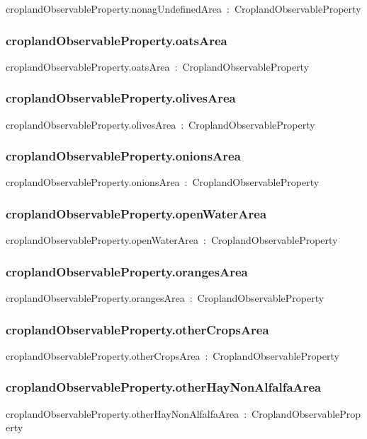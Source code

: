 \documentclass{article}
\begin{document}
croplandObservableProperty.nonagUndefinedArea~:~CroplandObservableProperty

\subsubsection*{croplandObservableProperty.oatsArea}

croplandObservableProperty.oatsArea~:~CroplandObservableProperty

\subsubsection*{croplandObservableProperty.olivesArea}

croplandObservableProperty.olivesArea~:~CroplandObservableProperty

\subsubsection*{croplandObservableProperty.onionsArea}

croplandObservableProperty.onionsArea~:~CroplandObservableProperty

\subsubsection*{croplandObservableProperty.openWaterArea}

croplandObservableProperty.openWaterArea~:~CroplandObservableProperty

\subsubsection*{croplandObservableProperty.orangesArea}

croplandObservableProperty.orangesArea~:~CroplandObservableProperty

\subsubsection*{croplandObservableProperty.otherCropsArea}

croplandObservableProperty.otherCropsArea~:~CroplandObservableProperty

\subsubsection*{croplandObservableProperty.otherHayNonAlfalfaArea}

croplandObservableProperty.otherHayNonAlfalfaArea~:~CroplandObservableProperty
\end{document}
